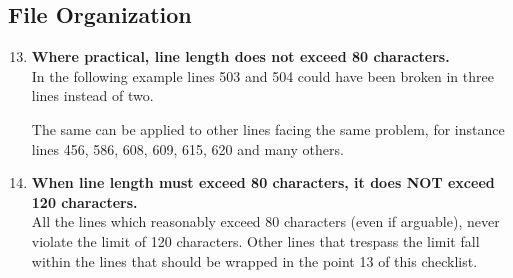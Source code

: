 \documentclass[a4paper,11pt]{report} %
\begin{document}
		\subsection*{File Organization}\begin{enumerate}[resume]
			\setcounter{enumi}{12}
			\item \textbf{Where practical, line length does not exceed 80 characters.}\smallskip \\
				In the following example lines 503 and 504 could have been broken in three lines instead of two.
				
				The same can be applied to other lines facing the same problem, for instance lines 456, 586, 608, 609, 615, 620 and many others.
			\item \textbf{When line length must exceed 80 characters, it does NOT exceed 120 characters.}\smallskip \\
				All the lines which reasonably exceed 80 characters (even if arguable), never violate the limit of 120 characters. Other lines that trespass the limit fall within the lines that should be wrapped in the point 13 of this checklist.
		\end{enumerate}
		\pagebreak
		
\end{document}
